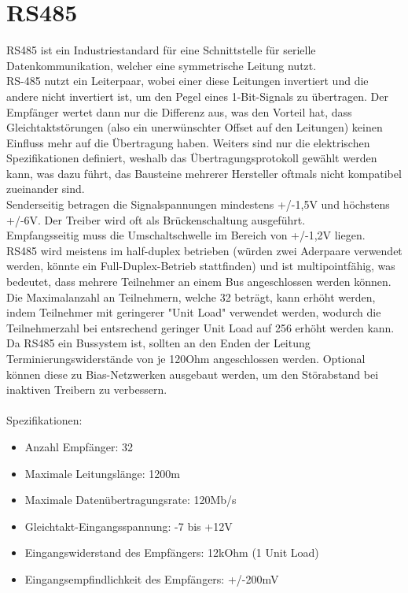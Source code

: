\documentclass[11pt]{report}
\begin{document}
	\section{RS485}
		RS485 ist ein Industriestandard für eine Schnittstelle für serielle Datenkommunikation, welcher eine symmetrische Leitung nutzt.\\
		RS-485 nutzt ein Leiterpaar, wobei einer diese Leitungen invertiert und die andere nicht invertiert ist, um den Pegel eines 1-Bit-Signals zu übertragen. Der Empfänger wertet dann nur die Differenz aus, was den Vorteil hat, dass Gleichtaktstörungen (also ein unerwünschter Offset auf den Leitungen) keinen Einfluss mehr auf die Übertragung haben. Weiters sind nur die elektrischen Spezifikationen definiert, weshalb das Übertragungsprotokoll gewählt werden kann, was dazu führt, das Bausteine mehrerer Hersteller oftmals nicht kompatibel zueinander sind.\\
		Senderseitig betragen die Signalspannungen mindestens +/-1,5V und höchstens +/-6V. Der Treiber wird oft als Brückenschaltung ausgeführt.\\
		Empfangsseitig muss die Umschaltschwelle im Bereich von +/-1,2V liegen.\\
		RS485 wird meistens im half-duplex betrieben (würden zwei Aderpaare verwendet werden, könnte ein Full-Duplex-Betrieb stattfinden) und ist multipointfähig, was bedeutet, dass mehrere Teilnehmer an einem Bus angeschlossen werden können. Die Maximalanzahl an Teilnehmern, welche 32 beträgt, kann erhöht werden, indem Teilnehmer mit geringerer "Unit Load" verwendet werden, wodurch die Teilnehmerzahl bei entsrechend geringer Unit Load auf 256 erhöht werden kann.\\
		Da RS485 ein Bussystem ist, sollten an den Enden der Leitung Terminierungswiderstände von je 120Ohm angeschlossen werden. Optional können diese zu Bias-Netzwerken ausgebaut werden, um den Störabstand bei inaktiven Treibern zu verbessern.\\
		\\Spezifikationen:
		\begin{itemize}
			\item Anzahl Empfänger: 32
			\item Maximale Leitungslänge: 1200m
			\item Maximale Datenübertragungsrate: 120Mb/s
			\item Gleichtakt-Eingangsspannung: -7 bis +12V
			\item Eingangswiderstand des Empfängers: 12kOhm (1 Unit Load)
			\item Eingangsempfindlichkeit des Empfängers: +/-200mV
		\end{itemize}
\end{document}
